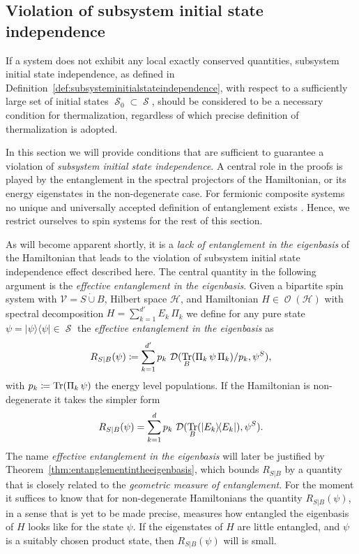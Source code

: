 \documentclass[a4paper,12pt,listof=totoc,index=totoc,bibliography=totoc,headsepline=false,headings=normal,BCOR16.153846mm,DIV12,headinclude,twoside,cleardoublepage=empty,numbers=noenddot,final]{scrreprt}
\theoremstyle{mystyle}
\numberwithin{equation}{section}
\numberwithin{figure}{section}
\numberwithin{lemma}{section}
\numberwithin{theorem}{section}
\numberwithin{corollary}{section}
\numberwithin{definition}{section}
\numberwithin{conjecture}{section}
\numberwithin{observation}{section}
\newcommand{\+}{\mkern2mu}
\newcommand{\coloneqq}{\mathrel{\vcentcolon\mkern-1.2mu=}} %
\newcommand{\dunion}{\mathbin{\dot{\cup}}}
\renewcommand{\H}{H}
\newcommand{\Vset}{\mathcal{V}}
\newcommand{\bra}[1]{\langle #1|}
\newcommand{\ket}[1]{|#1\rangle}
\newcommand{\ketbra}[2]{\ket{#1}\!\bra{#2}}
\newcommand{\tracedistance}[3][]{
  \ifthenelse{\equal{#2}{}}
  {\ifthenelse{\equal{#3}{}}
    {\mathcal{D}_{#1}}{}
  }{
    \ifthenelse{\equal{#1}{}}
    {\operatorname{\mathcal{D}}(#2,#3)}
    {\operatorname{\mathcal{D}}_{#1}(#2,#3)}
  }
}
\DeclareMathOperator{\1}{\mathds{1}}
\DeclareMathOperator{\Obs}{\mathcal{O}}
\DeclareMathOperator{\Qst}{\mathcal{S}}
\DeclareMathOperator{\Tr}{Tr}
\newcommand{\mc}[1]{\mathcal{#1}}
\newcommand{\mcH}{\mc{H}}
\begin{document}
\subsection{Violation of subsystem initial state independence}
\label{sec:violationofinitialstateindependence}
%
If a system does not exhibit any local exactly conserved quantities, subsystem initial state independence, as defined in Definition~\ref{def:subsysteminitialstateindependence}, with respect to a sufficiently large set of initial states $\Qst_0 \subset \Qst$, should be considered to be a necessary condition for thermalization, regardless of which precise definition of thermalization is adopted.

In this section we will provide conditions that are sufficient to guarantee a violation of \emph{subsystem initial state independence}.
A central role in the proofs is played by the entanglement in the spectral projectors of the Hamiltonian, or its energy eigenstates in the non-degenerate case.
For fermionic composite systems no unique and universally accepted definition of entanglement exists \cite{Banuls2007}.
Hence, we restrict ourselves to spin systems for the rest of this section.

As will become apparent shortly, it is a \emph{lack of entanglement in the eigenbasis} of the Hamiltonian that leads to the violation of subsystem initial state independence effect described here. 
The central quantity in the following argument is the \emph{effective entanglement in the eigenbasis}.
Given a bipartite spin system with $\Vset = S \dunion B$, Hilbert space $\mcH$, and Hamiltonian $\H \in \Obs(\mcH)$ with spectral decomposition $\H = \sum_{k=1}^{d'} E_k\,\Pi_k$ we define for any pure state $\psi = \ketbra\psi\psi \in \Qst$ the \emph{effective entanglement in the eigenbasis} as
\begin{equation}
  R_{S|B}(\psi) \coloneqq \sum_{k=1}^{d'} p_k\,\tracedistance{\Tr_B(\Pi_k\,\psi\,\Pi_k)/p_k}{\psi^S} ,
\end{equation}
with $p_k \coloneqq \Tr(\Pi_k\,\psi)$ the energy level populations.
If the Hamiltonian is non-degenerate it takes the simpler form
\begin{equation} \label{eq:effectiveentranglementintheeigenbasisnondegenerate}
  R_{S|B}(\psi) = \sum_{k=1}^{d} p_k\,\tracedistance{\Tr_B(\ketbra{E_k}{E_k})}{\psi^S} .
\end{equation}
The name \emph{effective entanglement in the eigenbasis} will later be justified by Theorem~\ref{thm:entanglementintheeigenbasis}, which bounds $R_{S|B}$ by a quantity that is closely related to the \emph{geometric measure of entanglement}.
For the moment it suffices to know that for non-degenerate Hamiltonians the quantity $R_{S|B}(\psi)$, in a sense that is yet to be made precise, measures how entangled the eigenbasis of $\H$ looks like for the state $\psi$.
If the eigenstates of $\H$ are little entangled, and $\psi$ is a suitably chosen product state, then $R_{S|B}(\psi)$ will is small.
\end{document}
